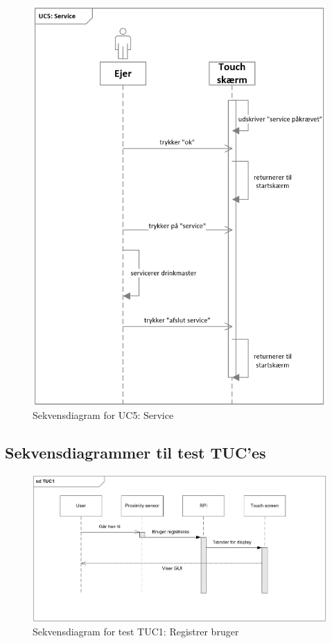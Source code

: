 \begin{figure}[H]
	\centering
	\includegraphics[width=1\textwidth]{Images/UC5service.png}
	\caption{Sekvensdiagram for UC5: Service}
	\label{fig:UC2_service}
\end{figure}

\subsection{Sekvensdiagrammer til test TUC'es}

\begin{figure}[H]
	\centering
	\includegraphics[width=1\textwidth]{Images/TUC1.png}
	\caption{Sekvensdiagram for test TUC1: Registrer bruger}
	\label{fig:testUC1}
\end{figure}

